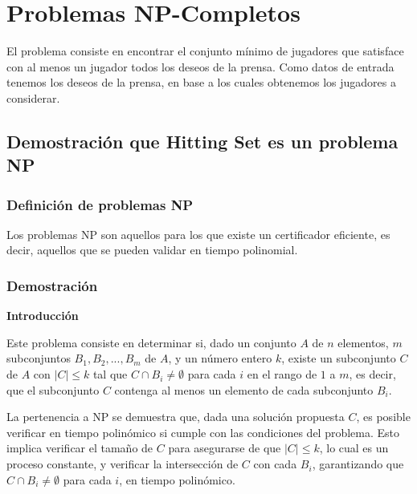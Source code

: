 \documentclass{estilo}
\begin{document}
\maketitle

\justifying{
}

% 
\newpage

\section{Problemas NP-Completos}

El problema consiste en encontrar el conjunto mínimo de jugadores que satisface con al menos un jugador todos los deseos de la prensa. Como datos de entrada tenemos los deseos de la prensa, en base a los cuales obtenemos los jugadores a considerar.


\subsection{Demostración que Hitting Set es un problema NP}

\subsubsection{Definición de problemas NP}
Los problemas NP son aquellos para los que existe un certificador eficiente, es decir, aquellos que se pueden validar en tiempo polinomial.

\subsubsection{Demostración}

\textbf{Introducción}

\hspace{0.5cm} Este problema consiste en determinar si, dado un conjunto \(A\) de \(n\) elementos, \(m\) subconjuntos \(B_1, B_2, ..., B_m\) de \(A\), y un número entero \(k\), existe un subconjunto \(C\) de \(A\) con \(|C| \leq k\) tal que \(C \cap B_i \neq \emptyset\) para cada \(i\) en el rango de \(1\) a \(m\), es decir, que el subconjunto $C$ contenga al menos un elemento de cada subconjunto $B_i$.

\hspace{0.5cm} La pertenencia a NP se demuestra que, dada una solución propuesta \(C\), es posible verificar en tiempo polinómico si cumple con las condiciones del problema. Esto implica verificar el tamaño de \(C\) para asegurarse de que \(|C| \leq k\), lo cual es un proceso constante, y verificar la intersección de \(C\) con cada \(B_i\), garantizando que \(C \cap B_i \neq \emptyset\) para cada \(i\), en tiempo polinómico.
\end{document}
